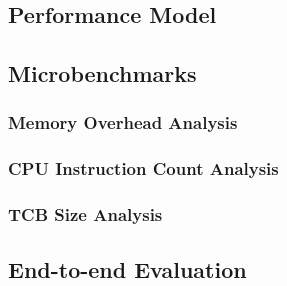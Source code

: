 \documentclass[../main.tex]{subfiles}
\begin{document}


% 
\subsection{Performance Model}


\subsection{Microbenchmarks}
\subsubsection{Memory Overhead Analysis}

\subsubsection{CPU Instruction Count Analysis}

\subsubsection{TCB Size Analysis}


\subsection{End-to-end Evaluation}

\end{document}

